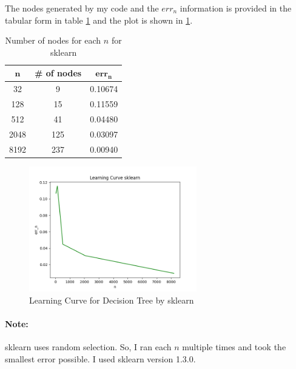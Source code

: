 \documentclass[a4paper]{article}
\theoremstyle{definition}
\newenvironment{soln}{
    \leavevmode\color{blue}\ignorespaces
}{}
\begin{document}
\begin{soln}
      The nodes generated by my code and the $err_n$ information is provided in the tabular form in table \ref{tab:3} and the plot is shown in \ref{fig:8}.

      \begin{table}[h]
          \centering
          \begin{tabular}{|c|c|c|}
              \hline
              $\mathbf{n}$ & \textbf{\# of nodes} & $\mathbf{err_n}$ \\
              \hline
              32 & 9 & 0.10674 \\
              \hline
              128 & 15 & 0.11559 \\
              \hline
              512 & 41 & 0.04480 \\
              \hline
              2048 & 125 & 0.03097 \\
              \hline
              8192 & 237 & 0.00940 \\
              \hline
          \end{tabular}
          \caption{Number of nodes for each $n$ for \textsf{sklearn}}
          \label{tab:3}
      \end{table}

    \begin{figure}[h]
        \centering
        \includegraphics[width=0.65\textwidth]{err_n_sklearn.png}
        \caption{Learning Curve for Decision Tree by \textsf{sklearn}}
        \label{fig:8}
    \end{figure}

    \paragraph{Note:} \textsf{sklearn} uses random selection. So, I ran each $n$ multiple times and took the smallest error possible. I used \textsf{sklearn} version 1.3.0.
  \end{soln}
\end{document}
